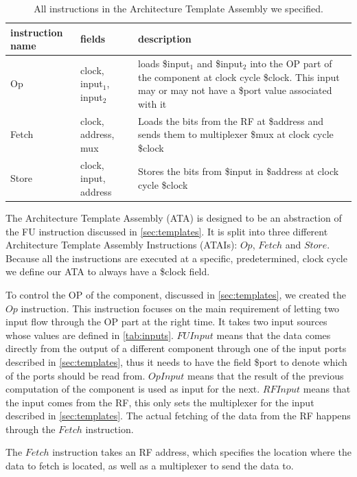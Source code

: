 \begin{table}
    \centering
    \begin{tabular}{@{}l|l p{}@{}}
        \toprule
        instruction name & fields & description\\
        \hline
        Op & clock, input$_1$, input$_2$ & loads \$input$_1$ and \$input$_2$ into the OP part of the component at clock cycle \$clock. This input may or may not have a \$port value associated with it\\
        Fetch & clock, address, mux & Loads the bits from the RF at \$address and sends them to multiplexer \$mux at clock cycle \$clock\\
        Store & clock, input, address & Stores the bits from \$input in \$address at clock cycle \$clock\\
\bottomrule
    \end{tabular}
    \caption{All instructions in the Architecture Template Assembly we specified.}
    \label{tab:insts}
\end{table}
The Architecture Template Assembly (ATA) is designed to be an abstraction of the FU instruction discussed in \ref{sec:templates}. It is split into three different Architecture Template Assembly Instructions (ATAIs): $Op$, $Fetch$ and $Store$. Because all the instructions are executed at a specific, predetermined, clock cycle we define our ATA to always have a \$clock field. %

To control the OP of the component, discussed in \ref{sec:templates}, we created the $Op$ instruction. This instruction focuses on the main requirement of letting two input flow through the OP part at the right time. It takes two input sources whose values are defined in \ref{tab:inputs}. $FUInput$ means that the data comes directly from the output of a different component through one of the input ports described in \ref{sec:templates}, thus it needs to have the field \$port to denote which of the ports should be read from. $OpInput$ means that the result of the previous computation of the component is used as input for the next. $RFInput$ means that the input comes from the RF, this only sets the multiplexer for the input described in \ref{sec:templates}. The actual fetching of the data from the RF happens through the $Fetch$ instruction.

The $Fetch$ instruction takes an RF address, which specifies the location where the data to fetch is located, as well as a multiplexer to send the data to.

